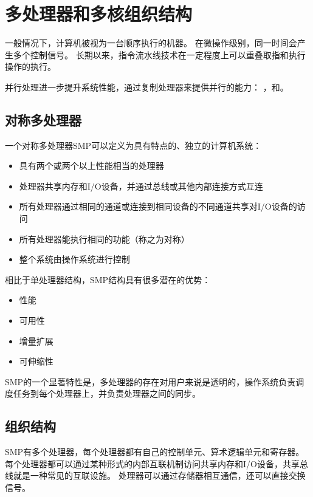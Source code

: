 
\section{多处理器和多核组织结构}
{
    一般情况下，计算机被视为一台顺序执行的机器。
    在微操作级别，同一时间会产生多个控制信号。
    长期以来，指令流水线技术在一定程度上可以重叠取指和执行操作的执行。

    并行处理进一步提升系统性能，通过复制处理器来提供并行的能力：
    ，和。

    \subsection{对称多处理器}
    {
        一个对称多处理器SMP可以定义为具有特点的、独立的计算机系统：

        \begin{itemize}
            \item 具有两个或两个以上性能相当的处理器
            \item 处理器共享内存和I/O设备，并通过总线或其他内部连接方式互连
            \item 所有处理器通过相同的通道或连接到相同设备的不同通道共享对I/O设备的访问
            \item 所有处理器能执行相同的功能（称之为对称）
            \item 整个系统由操作系统进行控制
        \end{itemize}

        相比于单处理器结构，SMP结构具有很多潜在的优势：

    \begin{itemize}
        \item 性能
        \item 可用性
        \item 增量扩展
        \item 可伸缩性
    \end{itemize}

    SMP的一个显著特性是，多处理器的存在对用户来说是透明的，操作系统负责调度任务到每个处理器上，并负责处理器之间的同步。
    }

    \subsection{组织结构}
    {
        SMP有多个处理器，每个处理器都有自己的控制单元、算术逻辑单元和寄存器。
        每个处理器都可以通过某种形式的内部互联机制访问共享内存和I/O设备，共享总线就是一种常见的互联设施。
        处理器可以通过存储器相互通信，还可以直接交换信号。

}}
